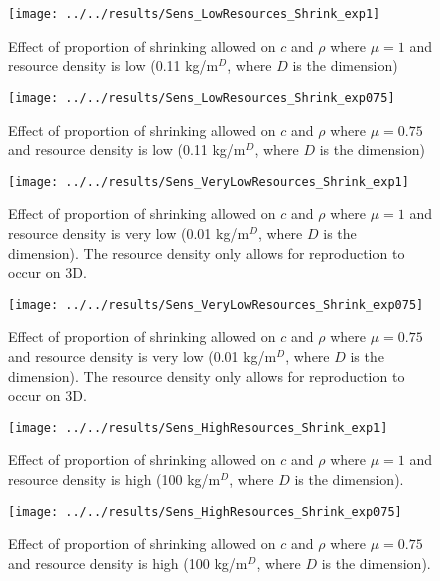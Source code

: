 \begin{figure}[H]
	\centering
	\texttt{[image: ../../results/Sens\_LowResources\_Shrink\_exp1]}
	\caption{Effect of proportion of shrinking allowed on $c$ and $\rho$ where $\mu = 1$ and resource density is low (0.11 kg/m$^D$, where $D$ is the dimension)}
	\label{fig:senslowresourcesshrinkexp1}
\end{figure}
\begin{figure}[h]
	\centering
	\texttt{[image: ../../results/Sens\_LowResources\_Shrink\_exp075]}
	\caption{Effect of proportion of shrinking allowed on $c$ and $\rho$ where $\mu = 0.75$ and resource density is low (0.11 kg/m$^D$, where $D$ is the dimension)}
	\label{fig:senslowresourcesshrinkexp075}
\end{figure}
\begin{figure}[h]
	\centering
	\texttt{[image: ../../results/Sens\_VeryLowResources\_Shrink\_exp1]}
	\caption{Effect of proportion of shrinking allowed on $c$ and $\rho$ where $\mu = 1$ and resource density is very low (0.01 kg/m$^D$, where $D$ is the dimension).  The resource density only allows for reproduction to occur on 3D.}
	\label{fig:sensverylowresourcesshrinkexp1}
\end{figure}
\begin{figure}[h]
	\centering
	\texttt{[image: ../../results/Sens\_VeryLowResources\_Shrink\_exp075]}
	\caption{Effect of proportion of shrinking allowed on $c$ and $\rho$ where $\mu = 0.75$ and resource density is very low (0.01 kg/m$^D$, where $D$ is the dimension).  The resource density only allows for reproduction to occur on 3D.}
	\label{fig:sensverylowresourcesshrinkexp075}
\end{figure}
\begin{figure}[h]
	\centering
	\texttt{[image: ../../results/Sens\_HighResources\_Shrink\_exp1]}
	\caption{Effect of proportion of shrinking allowed on $c$ and $\rho$ where $\mu = 1$ and resource density is high (100 kg/m$^D$, where $D$ is the dimension).}
	\label{fig:senshighresourcesshrinkexp1}
\end{figure}
\begin{figure}[h]
	\centering
	\texttt{[image: ../../results/Sens\_HighResources\_Shrink\_exp075]}
	\caption{Effect of proportion of shrinking allowed on $c$ and $\rho$ where $\mu = 0.75$ and resource density is high (100 kg/m$^D$, where $D$ is the dimension).}
	\label{fig:senshighresourcesshrinkexp075}
\end{figure}
